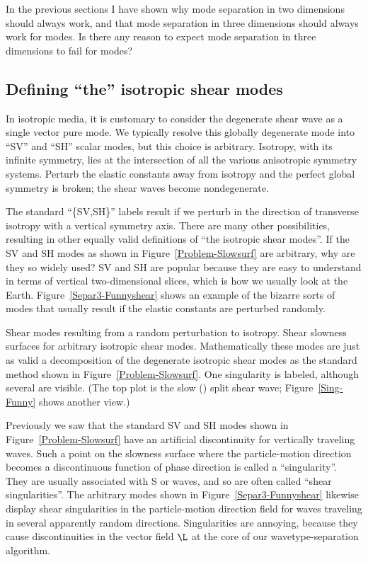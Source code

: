 In the previous sections I have shown why mode separation
in two dimensions should always work,
and that mode separation in three dimensions should
always work for {\qP} modes.
Is there any reason to expect mode separation in three dimensions
to fail for {\qS} modes?

\subsection{Defining ``the'' isotropic shear modes}

In isotropic media, it is customary to consider the degenerate
shear wave as a single vector pure mode.
We typically resolve this globally degenerate mode into
``SV'' and ``SH'' scalar modes, but this choice is arbitrary.
Isotropy, with its infinite symmetry,
lies at the intersection of all the various anisotropic
symmetry systems.
Perturb the elastic constants away from isotropy
and the perfect global symmetry is broken; the shear
waves become nondegenerate.

The standard ``\{SV,SH\}'' labels result
if we perturb in the direction of transverse isotropy
with a vertical symmetry axis.
There are many other possibilities,
resulting in other equally valid
definitions of ``the isotropic shear modes''.
If the SV and SH modes as shown in Figure~\ref{Problem-Slowsurf}
are arbitrary, why are they so widely used?
SV and SH are popular because they are easy to
understand in terms of vertical two-dimensional slices,
which is how we usually look at the Earth.
Figure~\ref{Separ3-Funnyshear}
shows an example of the bizarre sorts of modes that usually
result if the elastic constants are perturbed randomly.

{Shear modes resulting from a random perturbation to isotropy.}
{
Shear slowness surfaces for arbitrary isotropic shear modes.
Mathematically these modes are just as valid a decomposition
of the degenerate isotropic shear modes as the
standard method shown in Figure~\protect\ref{Problem-Slowsurf}.
One singularity is labeled, although several are visible.
(The top plot is the slow ({}) split shear wave;
Figure~\protect\ref{Sing-Funny} shows another view.)
}

Previously we saw that the standard SV and SH modes shown in
Figure~\ref{Problem-Slowsurf} have an artificial
discontinuity for vertically traveling waves.
Such a point on the slowness surface where
the particle-motion direction becomes a discontinuous
function of phase direction is called a ``singularity''.
They are usually associated with S or {\qS} waves, and so are
often called ``shear singularities''.
The arbitrary modes shown in Figure~\ref{Separ3-Funnyshear}
likewise display shear singularities in the particle-motion direction
field for waves traveling in several apparently random directions.
Singularities are annoying, because they cause discontinuities
in the vector field $\L$ at the core of our wavetype-separation algorithm.

